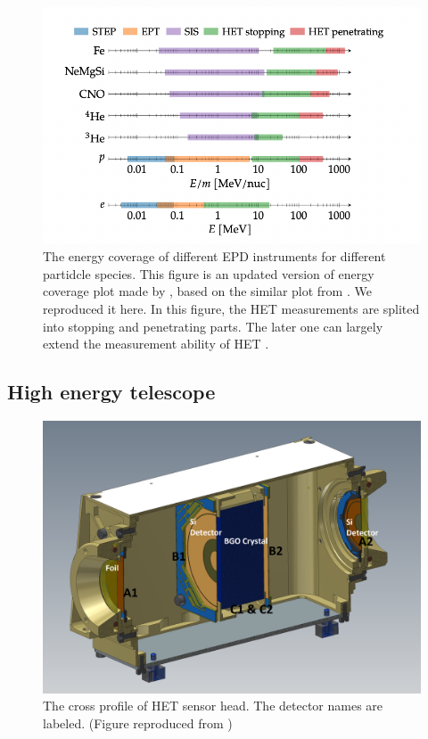 \begin{figure}
    \centering
    \includegraphics[width = \textwidth]{images/EPD_coverage.png}
    \caption[The energy coverage of EPD instruments]{The energy coverage of different \ac{EPD} instruments for different partidcle species. This figure is an updated version of energy coverage plot made by \citep{JohanPhd2020}, based on the similar plot from \citep{RodriguezPacheco-2019-EPD}. We reproduced it here. In this figure, the HET measurements are splited into stopping and penetrating parts. The later one can largely extend the measurement ability of HET \citet{Elftmann-2020-PhD}.}
    \label{Fig:EPD-energy-coverage}
\end{figure}  

\subsection{High energy telescope}

\begin{figure}
    \centering
    \includegraphics[width = \textwidth]{images/het.png}
    \caption[The HET sensor head]{The cross profile of HET sensor head. The detector names are labeled. (Figure reproduced from \citep{RodriguezPacheco-2019-EPD})}
    \label{fig:HET-sensor-head}
\end{figure}

